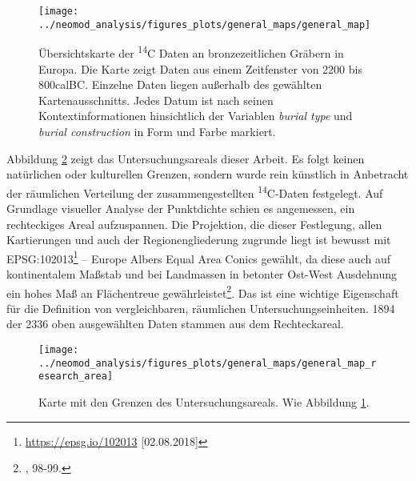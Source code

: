 \documentclass[openany,twoside,twocolumn]{book}
\let\rmarkdownfootnote\footnote%
\def\footnote{\protect\rmarkdownfootnote}
\begin{document}
\begin{figure}
\texttt{[image: ../neomod\_analysis/figures\_plots/general\_maps/general\_map]} \caption[Übersichtskarte der \textsuperscript{14}C Daten an bronzezeitlichen Gräbern in Europa]{Übersichtskarte der \textsuperscript{14}C Daten an bronzezeitlichen Gräbern in Europa. Die Karte zeigt Daten aus einem  Zeitfenster von 2200 bis 800calBC. Einzelne Daten liegen außerhalb des gewählten Kartenausschnitts. Jedes Datum ist nach seinen Kontextinformationen hinsichtlich der Variablen \textit{burial type} und \textit{burial construction} in Form und Farbe markiert.}\label{fig:general-map}
\end{figure}

Abbildung \ref{fig:general-map-research-area} zeigt das
Untersuchungsareals dieser Arbeit. Es folgt keinen natürlichen oder
kulturellen Grenzen, sondern wurde rein künstlich in Anbetracht der
räumlichen Verteilung der zusammengestellten \textsuperscript{14}C-Daten
festgelegt. Auf Grundlage visueller Analyse der Punktdichte schien es
angemessen, ein rechteckiges Areal aufzuspannen. Die Projektion, die
dieser Festlegung, allen Kartierungen und auch der Regionengliederung
zugrunde liegt ist bewusst mit EPSG:102013\footnote{\url{https://epsg.io/102013}
  {[}02.08.2018{]}} -- Europe Albers Equal Area Conics gewählt, da diese
auch auf kontinentalem Maßstab und bei Landmassen in betonter Ost-West
Ausdehnung ein hohes Maß an Flächentreue gewährleistet\footnote{\textcite{snyder_map_1987},
  98-99.}. Das ist eine wichtige Eigenschaft für die Definition von
vergleichbaren, räumlichen Untersuchungseinheiten. 1894 der 2336 oben
ausgewählten Daten stammen aus dem Rechteckareal.

\begin{figure}
\texttt{[image: ../neomod\_analysis/figures\_plots/general\_maps/general\_map\_research\_area]} \caption[Karte mit den Grenzen des Untersuchungsareals]{Karte mit den Grenzen des Untersuchungsareals. Wie Abbildung \ref{fig:general-map}.}\label{fig:general-map-research-area}
\end{figure}
\end{document}

